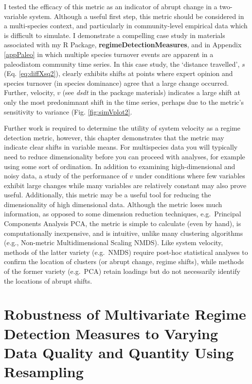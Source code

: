 \documentclass[12pt,twoside,openany]{reedthesis}
\begin{document}
I tested the efficacy of this metric as an indicator of abrupt change in a two-variable system. Although a useful first step, this metric should be considered in a multi-species context, and particularly in community-level empirical data which is difficult to simulate. I demonstrate a compelling case study in materials associated with my R Package, \textbf{regimeDetectionMeasures}, and in Appendix \ref{appPaleo} in which multiple species turnover events are apparent in a paleodiatom community time series. In this case study, the `distance travelled', \(s\) (Eq. \eqref{eq:diffXsq2}), clearly exhibits shifts at points where expert opinion and species turnover (in species dominance) agree that a large change occurred. Further, velocity, \(v\) (see \emph{dsdt} in the package materials) indicates a large shift at only the most predonimnant shift in the time series, perhaps due to the metric's sensitivity to variance (Fig. \ref{fig:simVplot2}.

Further work is required to determine the utility of system velocity as a regime detection metric, however, this chapter demonstrates that the metric may indicate clear shifts in variable means. For multispecies data you will typically need to reduce dimensionality before you can proceed with analyses, for example using some sort of ordination. In addition to examining high-dimensional and noisy data, a study of the performance of \(v\) under conditions where few variables exhibit large changes while many variables are relatively constant may also prove useful. Additionally, this metric may be a useful tool for reducing the dimensionality of high dimensional data. Although the metric loses much information, as opposed to some dimension reduction techniques, e.g.~Principal Components Analysis PCA, the metric is simple to calculate (even by hand), is computationally inexpensive, and is intuitive, unlike many clustering algorithms (e.g., Non-metric Multidimensional Scaling NMDS). Like system velocity, methods of the latter variety (e.g.~NMDS) require post-hoc statistical analyses to confirm the location of clusters (or abrupt change, regime shifts), while methods of the former variety (e.g.~PCA) retain loadings but do not necessarily identify the locations of abrupt shifts.

\hypertarget{resampling}{%
\chapter{Robustness of Multivariate Regime Detection Measures to Varying Data Quality and Quantity Using Resampling}\label{resampling}}
\end{document}
